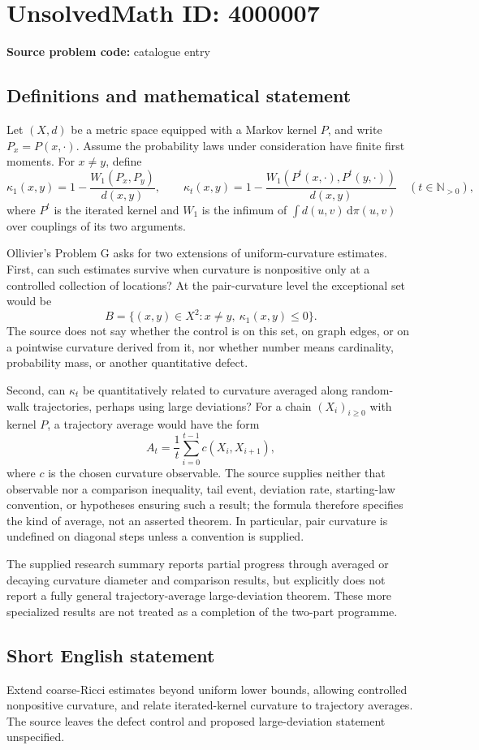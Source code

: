\documentclass[11pt]{article}
\newcommand{\N}{\mathbb{N}}
\begin{document}
\section*{UnsolvedMath ID: 4000007}
\textbf{Source problem code:} catalogue entry
\subsection{Definitions and mathematical statement}
Let \((X,d)\) be a metric space equipped with a Markov kernel \(P\), and write \(P_x=P(x,\cdot)\). Assume the probability laws under consideration have finite first moments. For \(x\ne y\), define
\[
\kappa_1(x,y)=1-\frac{W_1(P_x,P_y)}{d(x,y)},\qquad
\kappa_t(x,y)=1-\frac{W_1(P^t(x,\cdot),P^t(y,\cdot))}{d(x,y)}
\quad(t\in\N_{>0}),
\]
where \(P^t\) is the iterated kernel and \(W_1\) is the infimum of \(\int d(u,v)\,\mathrm d\pi(u,v)\) over couplings of its two arguments.

Ollivier's Problem G asks for two extensions of uniform-curvature estimates. First, can such estimates survive when curvature is nonpositive only at a controlled collection of locations? At the pair-curvature level the exceptional set would be
\[
B=\{(x,y)\in X^2:x\ne y,\ \kappa_1(x,y)\le0\}.
\]
The source does not say whether the control is on this set, on graph edges, or on a pointwise curvature derived from it, nor whether number means cardinality, probability mass, or another quantitative defect.

Second, can \(\kappa_t\) be quantitatively related to curvature averaged along random-walk trajectories, perhaps using large deviations? For a chain \((X_i)_{i\ge0}\) with kernel \(P\), a trajectory average would have the form
\[
A_t=\frac1t\sum_{i=0}^{t-1}c(X_i,X_{i+1}),
\]
where \(c\) is the chosen curvature observable. The source supplies neither that observable nor a comparison inequality, tail event, deviation rate, starting-law convention, or hypotheses ensuring such a result; the formula therefore specifies the kind of average, not an asserted theorem. In particular, pair curvature is undefined on diagonal steps unless a convention is supplied.

The supplied research summary reports partial progress through averaged or decaying curvature diameter and comparison results, but explicitly does not report a fully general trajectory-average large-deviation theorem. These more specialized results are not treated as a completion of the two-part programme.
\subsection{Short English statement}
Extend coarse-Ricci estimates beyond uniform lower bounds, allowing controlled nonpositive curvature, and relate iterated-kernel curvature to trajectory averages. The source leaves the defect control and proposed large-deviation statement unspecified.
\end{document}
